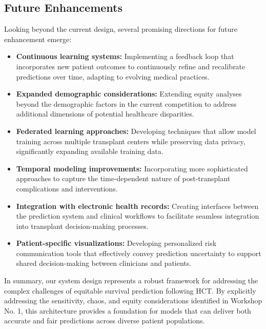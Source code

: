 \subsection{Future Enhancements}

Looking beyond the current design, several promising directions for future enhancement emerge:

\begin{itemize}
    \item \textbf{Continuous learning systems:} Implementing a feedback loop that incorporates new patient outcomes to continuously refine and recalibrate predictions over time, adapting to evolving medical practices.
    
    \item \textbf{Expanded demographic considerations:} Extending equity analyses beyond the demographic factors in the current competition to address additional dimensions of potential healthcare disparities.
    
    \item \textbf{Federated learning approaches:} Developing techniques that allow model training across multiple transplant centers while preserving data privacy, significantly expanding available training data.
    
    \item \textbf{Temporal modeling improvements:} Incorporating more sophisticated approaches to capture the time-dependent nature of post-transplant complications and interventions.
    
    \item \textbf{Integration with electronic health records:} Creating interfaces between the prediction system and clinical workflows to facilitate seamless integration into transplant decision-making processes.
    
    \item \textbf{Patient-specific visualizations:} Developing personalized risk communication tools that effectively convey prediction uncertainty to support shared decision-making between clinicians and patients.
\end{itemize}

In summary, our system design represents a robust framework for addressing the complex challenges of equitable survival prediction following HCT. By explicitly addressing the sensitivity, chaos, and equity considerations identified in Workshop No. 1, this architecture provides a foundation for models that can deliver both accurate and fair predictions across diverse patient populations.